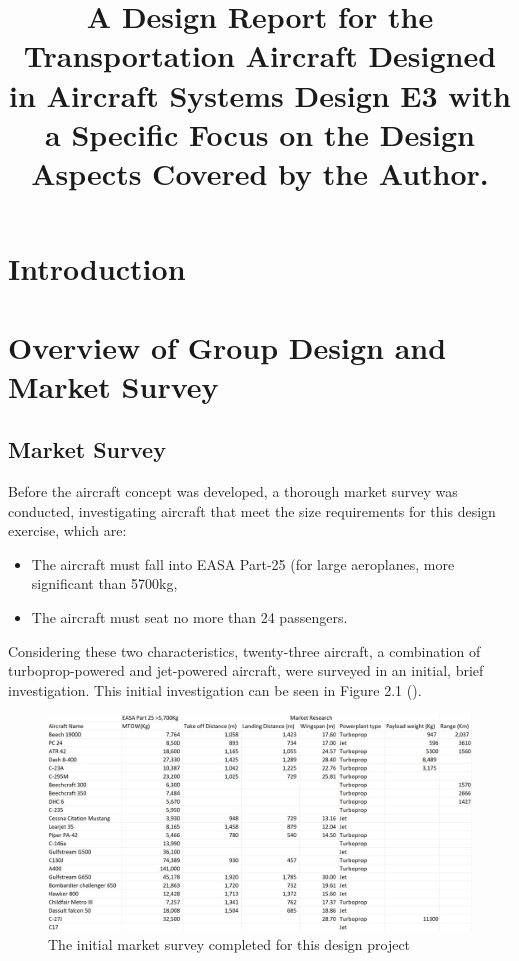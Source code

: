 \documentclass[stu, a4paper, 12pt, floatsintext]{apa7}
\title{A Design Report for the Transportation Aircraft Designed in Aircraft Systems Design E3 with a Specific Focus on the Design Aspects Covered by the Author.}
\numberwithin{figure}{section}
\numberwithin{table}{section}
\numberwithin{equation}{section}
\begin{document}
\maketitle{} %

\tableofcontents

\newpage

\listoffigures
{}
\listoftables
{}
\listofmyequations

\newpage

\section{Introduction}
\section{Overview of Group Design and Market Survey}
\subsection{Market Survey}
Before the aircraft concept was developed, a thorough market survey was conducted, investigating aircraft that meet the size requirements for this design exercise, which are:
\begin{itemize}
    \item The aircraft must fall into EASA Part-25 (for large aeroplanes, more significant than 5700kg,
    \item The aircraft must seat no more than 24 passengers.     
\end{itemize}
Considering these two characteristics, twenty-three aircraft, a combination of turboprop-powered and jet-powered aircraft, were surveyed in an initial, brief investigation. This initial investigation can be seen in Figure 2.1 (\cite{janes2023}). 

\begin{figure}[H]
    \caption{The initial market survey completed for this design project}
    \label{fig:market_survey_initial}
    \centering
    \includegraphics[width=1.1\textwidth]{pictures/market_survey_initial.jpg}
\end{figure}
\end{document}
